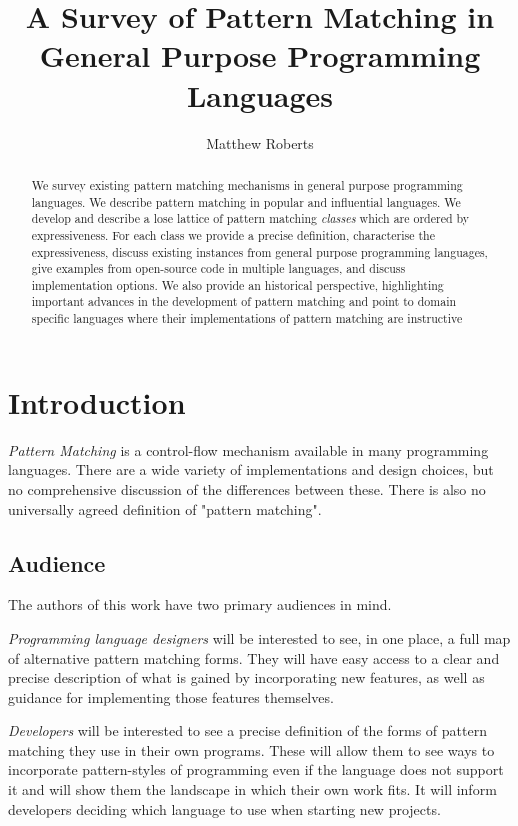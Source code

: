 \documentclass[acmsmall]{acmart}
\title{A Survey of Pattern Matching in General Purpose Programming Languages}
\author{Matthew Roberts}
\affiliation{%
  \institution{Macquarie University}
  \city{Sydney}
  \country{Australia}
}
\begin{document}
\begin{abstract}
We survey existing pattern matching mechanisms in general purpose programming languages.  We describe pattern matching in popular and influential languages.  We develop and describe a lose lattice of pattern matching \emph{classes} which are ordered by expressiveness.  For each class we provide a precise definition, characterise the expressiveness, discuss existing instances from general purpose programming languages, give examples from open-source code in multiple languages, and discuss implementation options.  We also provide an historical perspective, highlighting important advances in the development of pattern matching and point to domain specific languages where their implementations of pattern matching are instructive
\end{abstract}

\maketitle

\section{Introduction}

\emph{Pattern Matching} is a control-flow mechanism available in many programming languages. There are a wide variety of implementations and design choices, but no comprehensive discussion of the differences between these.  There is also no universally agreed definition of "pattern matching". 

\subsection{Audience}
The authors of this work have two primary audiences in mind.  

\emph{Programming language designers} will be interested to see, in one place, a full map of alternative pattern matching forms.  They will have easy access to a clear and precise description of what is gained by incorporating new features, as well as guidance for implementing those features themselves.  

\emph{Developers} will be interested to see a precise definition of the forms of pattern matching they use in their own programs.  These will allow them to see ways to incorporate pattern-styles of programming even if the language does not support it and will show them the landscape in which their own work fits.  It will inform developers deciding which language to use when starting new projects.  
\end{document}
